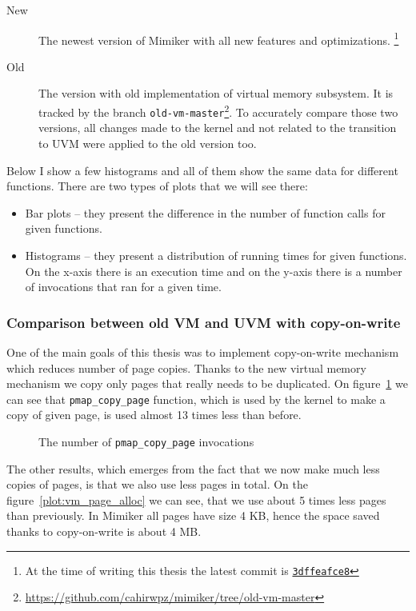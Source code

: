 \begin{description}
  \item[New]
    The newest version of Mimiker with all new features and optimizations.
    \footnote{At the time of writing this thesis the latest commit is
    \href{https://github.com/cahirwpz/mimiker/commit/3dffeafce8dbba33741505163d7856dbc0f1dd36}{\tt 3dffeafce8}}
  \item[Old]
    The version with old implementation of virtual memory subsystem.
    It is tracked by the branch {\tt old-vm-master}\footnote{\url{https://github.com/cahirwpz/mimiker/tree/old-vm-master}}.
    To accurately compare those two versions, all changes made to the kernel and not related to the transition to UVM were applied to the old version too.
\end{description}

Below I show a few histograms and all of them show the same data for different functions.
There are two types of plots that we will see there:
\begin{itemize}
  \item Bar plots -- they present the difference in the number of function calls for given functions.
  \item Histograms -- they present a distribution of running times for given functions.
    On the x-axis there is an execution time and on the y-axis there is a number of invocations that ran for a given time.
\end{itemize}

\subsubsection{Comparison between old VM and UVM with copy-on-write}

One of the main goals of this thesis was to implement copy-on-write mechanism which reduces number of page copies.
Thanks to the new virtual memory mechanism we copy only pages that really needs to be duplicated.
On figure~\ref{plot:pmap_copy_page} we can see that \texttt{pmap_copy_page} function, which is used by the kernel
to make a copy of given page, is used almost 13 times less than before.

\begin{figure}[h]
  \centering
  \caption{The number of \texttt{pmap_copy_page} invocations}
  \label{plot:pmap_copy_page}
\end{figure}

The other results, which emerges from the fact that we now make much less copies of pages, is that we also use less pages in total.
On the figure~\ref{plot:vm_page_alloc} we can see, that we use about 5 times less pages than previously.
In Mimiker all pages have size 4 KB, hence the space saved thanks to copy-on-write is about 4 MB.


